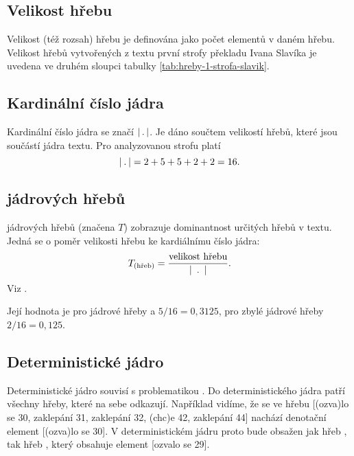 \documentclass[dp.tex]{subfiles}
\begin{document}
\subsection{Velikost hřebu}
Velikost (též rozsah) hřebu je definována jako počet elementů v daném hřebu. Velikost hřebů vytvořených z textu první strofy překladu Ivana Slavíka je uvedena ve druhém sloupci tabulky \ref{tab:hreby-1-strofa-slavik}.

\subsection{Kardinální číslo jádra}
Kardinální číslo jádra se značí $|\kern 2pt.\kern 2pt|$. Je dáno součtem velikostí hřebů, které jsou součástí jádra textu. Pro analyzovanou strofu platí
\begin{equation}
	|\kern 2pt.\kern 2pt| = 2 + 5 + 5 + 2 + 2 = 16.
\end{equation}
\subsection{ jádrových hřebů}
 jádrových hřebů (značena $T$) zobrazuje dominantnost určitých hřebů v textu.  Jedná se o poměr velikosti hřebu ke kardiálnímu číslo jádra:
\begin{equation}
T_\text{(hřeb)}=\frac{\text{velikost hřebu}}{|\kern 5pt.\kern 5pt|}.
\end{equation}
Viz \cite[str. 302]{Wimmer2003}. 

Její hodnota je pro jádrové hřeby  a  $5 / 16 = 0{,}3125$, pro zbylé jádrové hřeby $2 / 16 = 0{,}125$.

\subsection{Deterministické jádro}

Deterministické jádro souvisí s problematikou  . Do deterministického jádra patří všechny hřeby, které na sebe odkazují. Například vidíme, že se ve hřebu  [(ozva)lo se 30, zaklepání 31, zaklepání 32, (chc)e 42, zaklepání 44] nachází denotační element [(ozva)lo se 30]. V deterministickém jádru proto bude obsažen jak hřeb , tak hřeb , který obsahuje element [ozvalo se 29].
\end{document}
